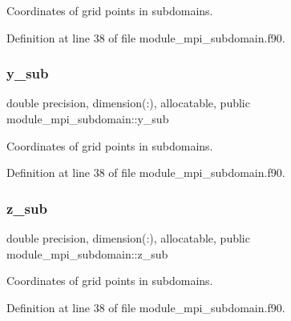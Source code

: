 Coordinates of grid points in subdomains. 



Definition at line 38 of file module\+\_\+mpi\+\_\+subdomain.\+f90.

\mbox{\label{namespacemodule__mpi__subdomain_ac39b52c6423a346d4697c47057631257}} 
\subsubsection{\texorpdfstring{y\_sub}{y\_sub}}
{\footnotesize\ttfamily double precision, dimension(\+:), allocatable, public module\+\_\+mpi\+\_\+subdomain\+::y\+\_\+sub}



Coordinates of grid points in subdomains. 



Definition at line 38 of file module\+\_\+mpi\+\_\+subdomain.\+f90.

\mbox{\label{namespacemodule__mpi__subdomain_abd5356a51fd823d37ecc203933a8a3c6}} 
\subsubsection{\texorpdfstring{z\_sub}{z\_sub}}
{\footnotesize\ttfamily double precision, dimension(\+:), allocatable, public module\+\_\+mpi\+\_\+subdomain\+::z\+\_\+sub}



Coordinates of grid points in subdomains. 



Definition at line 38 of file module\+\_\+mpi\+\_\+subdomain.\+f90.

